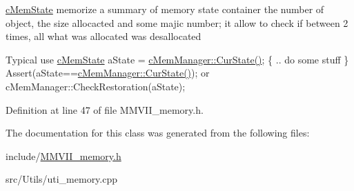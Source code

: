 \hyperlink{classMMVII_1_1cMemState}{c\+Mem\+State} memorize a summary of memory state container the number of object, the size allocacted and some majic number; it allow to check if between 2 times, all what was allocated was desallocated

Typical use \hyperlink{classMMVII_1_1cMemState}{c\+Mem\+State} a\+State = \hyperlink{classMMVII_1_1cMemManager_a10fec01028466ffbefe5f431a21e2c62}{c\+Mem\+Manager\+::\+Cur\+State()}; \{ .. do some stuff \} Assert(a\+State==\hyperlink{classMMVII_1_1cMemManager_a10fec01028466ffbefe5f431a21e2c62}{c\+Mem\+Manager\+::\+Cur\+State()}); or c\+Mem\+Manager\+::\+Check\+Restoration(a\+State); 

Definition at line 47 of file M\+M\+V\+I\+I\+\_\+memory.\+h.



The documentation for this class was generated from the following files\+:\begin{DoxyCompactItemize}
\item 
include/\hyperlink{MMVII__memory_8h}{M\+M\+V\+I\+I\+\_\+memory.\+h}\item 
src/\+Utils/uti\+\_\+memory.\+cpp\end{DoxyCompactItemize}
